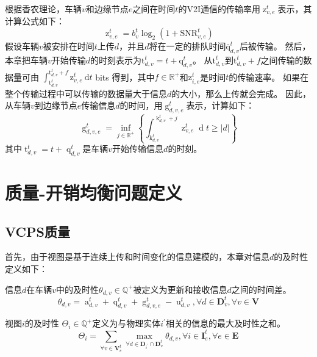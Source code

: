 根据香农理论，车辆$v$和边缘节点$e$之间在时间$t$的V2I通信的传输率用$\operatorname{z}_{v, e}^t$表示，其计算公式如下：
\begin{equation}
    \operatorname{z}_{v, e}^t=b_{v}^{t} \log _{2}\left(1+\mathrm{SNR}_{v, e}^{t}\right)
\end{equation}
假设车辆$v$被安排在时间$t$上传$d$，并且$d$将在一定的排队时间$\mathrm{\bar{q}}_{d, v}^t$后被传输。
然后，本章把车辆$v$开始传输$d$的时刻表示为$\mathrm{t}_{d, v}^t=t+\mathrm{q}_{d, v}^t$。
从$\mathrm{t}_{d, v}^t$到$\mathrm{t}_{d, v}^t + f$之间传输的数据量可由 $\int_{\mathrm{t}_{d, v}^t}^{\mathrm{t}_{d, v}^t+f} \mathrm{z}_{v, e}^t \mathrm{~d} t$ bits 得到，其中$f \in \mathbb{R}^{+}$和$\mathrm{z}_{i, e}^t$是时间$t$的传输速率。
如果在整个传输过程中可以传输的数据量大于信息$d$的大小，那么上传就会完成。
因此，从车辆$v$到边缘节点$e$传输信息$d$的时间，用$\operatorname{g}_{d, v, e}^t$表示，计算如下：
\begin{equation}
    \operatorname{g}_{d, v, e}^t=\inf _{j \in \mathbb{R}^+} \left \{ \int_{\operatorname{k}_{d, v}^t}^{\operatorname{k}_{d, v}^t + j} {\operatorname{z}_{v, e}^t} \operatorname{d}t \geq \left|d\right| \right \} 
\end{equation}
\noindent 其中$\operatorname{t}_{d, v}^t = t +\operatorname{q}_{d, v}^t$是车辆$v$开始传输信息$d$的时刻。

\section[\hspace{-2pt}质量-开销均衡问题定义]{{ \hspace{-8pt}质量-开销均衡问题定义}}\label{section 4-4}

\subsection[\hspace{-2pt}VCPS质量]{{ \hspace{-8pt}VCPS质量}}

首先，由于视图是基于连续上传和时间变化的信息建模的，本章对信息$d$的及时性定义如下：
\begin{definition}
信息$d$在车辆$v$中的及时性$\theta_{d, v} \in \mathbb{Q}^{+}$被定义为更新和接收信息$d$之间的时间差。
\begin{equation}
    \theta_{d, v} = \operatorname{a}_{d, v}^t + \operatorname{q}_{d, v}^t + \operatorname{g}_{d, v, e}^t-\operatorname{u}_{d, v}^{t}, \forall d \in \mathbf{D}_v^t,\forall v \in \mathbf{V}
\end{equation}
\end{definition}
\begin{definition}
视图$i$的及时性 $\Theta_{i} \in \mathbb{Q}^{+}$定义为与物理实体$i^{\prime}$相关的信息的最大及时性之和。
	\begin{equation}
    	\Theta_{i} = \sum_{\forall v\in \mathbf{V}_{e}^{t}} \max_{\forall d \in \mathbf{D}_{i^{\prime}} \cap \mathbf{D}_v^t}\theta_{d, v}, \forall i \in \mathbf{I}_{e}^{t}, \forall e \in \mathbf{E}
    	\label{equ 4-16}
	\end{equation}
\end{definition}

